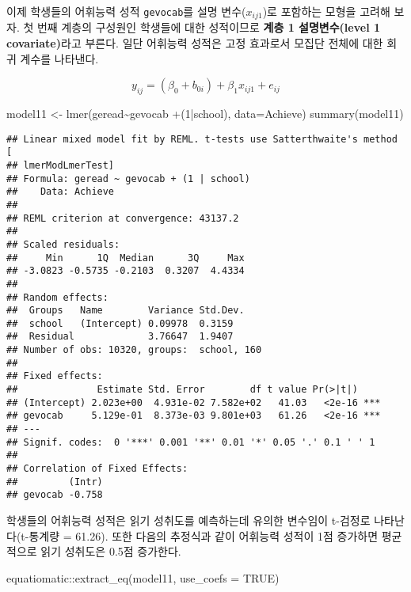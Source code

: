 \documentclass[
]{book}
\newenvironment{Shaded}{\begin{snugshade}}{\end{snugshade}}
\newcommand{\AttributeTok}[1]{\textcolor[rgb]{0.77,0.63,0.00}{#1}}
\newcommand{\ConstantTok}[1]{\textcolor[rgb]{0.00,0.00,0.00}{#1}}
\newcommand{\DecValTok}[1]{\textcolor[rgb]{0.00,0.00,0.81}{#1}}
\newcommand{\FunctionTok}[1]{\textcolor[rgb]{0.00,0.00,0.00}{#1}}
\newcommand{\NormalTok}[1]{#1}
\newcommand{\OtherTok}[1]{\textcolor[rgb]{0.56,0.35,0.01}{#1}}
\newcommand{\SpecialCharTok}[1]{\textcolor[rgb]{0.00,0.00,0.00}{#1}}
\begin{document}
이제 학생들의 어휘능력 성적 \texttt{gevocab}를 설명 변수(\(x_{ij1}\))로 포함하는 모형을 고려해 보자.
첫 번째 계층의 구성원인 학생들에 대한 성적이므로 \textbf{계층 1 설명변수(level 1 covariate)}라고 부른다.
일단 어휘능력 성적은 고정 효과로서 모집단 전체에 대한 회귀 계수를 나타낸다.

\begin{equation}
y_{ij} = (\beta_0 + b_{0i}) + \beta_1 x_{ij1} + e_{ij}
\label{eq:multimodel11}
\end{equation}

\begin{Shaded}
\begin{Highlighting}[]
\NormalTok{model11 }\OtherTok{\textless{}{-}} \FunctionTok{lmer}\NormalTok{(geread}\SpecialCharTok{\textasciitilde{}}\NormalTok{gevocab }\SpecialCharTok{+}\NormalTok{(}\DecValTok{1}\SpecialCharTok{|}\NormalTok{school), }\AttributeTok{data=}\NormalTok{Achieve)}
\FunctionTok{summary}\NormalTok{(model11)}
\end{Highlighting}
\end{Shaded}

\begin{verbatim}
## Linear mixed model fit by REML. t-tests use Satterthwaite's method [
## lmerModLmerTest]
## Formula: geread ~ gevocab + (1 | school)
##    Data: Achieve
## 
## REML criterion at convergence: 43137.2
## 
## Scaled residuals: 
##     Min      1Q  Median      3Q     Max 
## -3.0823 -0.5735 -0.2103  0.3207  4.4334 
## 
## Random effects:
##  Groups   Name        Variance Std.Dev.
##  school   (Intercept) 0.09978  0.3159  
##  Residual             3.76647  1.9407  
## Number of obs: 10320, groups:  school, 160
## 
## Fixed effects:
##              Estimate Std. Error        df t value Pr(>|t|)    
## (Intercept) 2.023e+00  4.931e-02 7.582e+02   41.03   <2e-16 ***
## gevocab     5.129e-01  8.373e-03 9.801e+03   61.26   <2e-16 ***
## ---
## Signif. codes:  0 '***' 0.001 '**' 0.01 '*' 0.05 '.' 0.1 ' ' 1
## 
## Correlation of Fixed Effects:
##         (Intr)
## gevocab -0.758
\end{verbatim}

학생들의 어휘능력 성적은 읽기 성취도를 예측하는데 유의한 변수임이 t-검정로 나타난다(t-통계량 = 61.26). 또한 다음의 추정식과 같이 어휘능력 성적이 1점 증가하면 평균적으로 읽기 성취도은 0.5점 증가한다.

\begin{Shaded}
\begin{Highlighting}[]
\NormalTok{equatiomatic}\SpecialCharTok{::}\FunctionTok{extract\_eq}\NormalTok{(model11, }\AttributeTok{use\_coefs =} \ConstantTok{TRUE}\NormalTok{)}
\end{Highlighting}
\end{Shaded}
\end{document}

